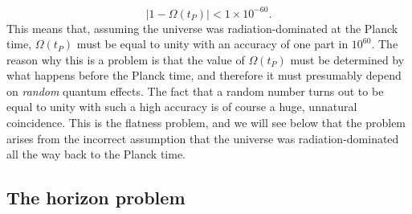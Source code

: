 \begin{equation} \label{eq:flatness_plancktime}
|1-\Omega(t_P)|<1\times10^{-60}.
\end{equation}
This means that, assuming the universe was radiation-dominated at the Planck time, $\Omega(t_P)$ must be equal to unity with an accuracy of one part in $10^{60}$. The reason why this is a problem is that the value of $\Omega(t_P)$ must be determined by what happens before the Planck time, and therefore it must presumably depend on {\it random} quantum effects. The fact that a random number turns out to be equal to unity with such a high accuracy is of course a huge, unnatural coincidence. This is the flatness problem, and we will see below that the problem arises from the incorrect assumption that the universe was radiation-dominated all the way back to the Planck time.

\subsection{The horizon problem}

